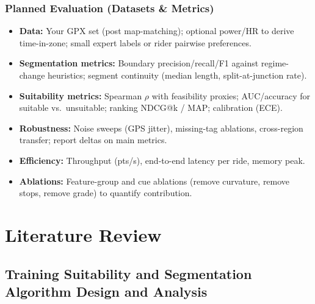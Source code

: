 \documentclass[11pt,twoside]{report}
\begin{document}
\subsection{Planned Evaluation (Datasets \& Metrics)}
\begin{itemize}[leftmargin=2.2em]
	\item \textbf{Data:} Your GPX set (post map-matching); optional power/HR to derive time-in-zone; small expert labels or rider pairwise preferences.
	\item \textbf{Segmentation metrics:} Boundary precision/recall/F1 against regime-change heuristics; segment continuity (median length, split-at-junction rate).
	\item \textbf{Suitability metrics:} Spearman $\rho$ with feasibility proxies; AUC/accuracy for suitable vs.\ unsuitable; ranking NDCG@k / MAP; calibration (ECE).
	\item \textbf{Robustness:} Noise sweeps (GPS jitter), missing-tag ablations, cross-region transfer; report deltas on main metrics.
	\item \textbf{Efficiency:} Throughput (pts/s), end-to-end latency per ride, memory peak.
	\item \textbf{Ablations:} Feature-group and cue ablations (remove curvature, remove stops, remove grade) to quantify contribution.
\end{itemize}

\chapter{Literature Review}
\label{chap:litreview}

\section{Training Suitability and Segmentation Algorithm Design and Analysis}
\end{document}
